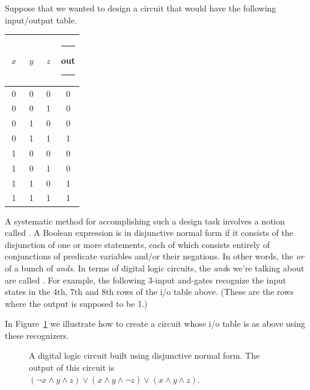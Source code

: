 Suppose that we wanted to design a circuit that would
have the following input/output table.

\begin{center}
\begin{tabular}{c|c|c|c}
$\; x \;$ & $\; y \;$ & $\; z \;$ & \rule{5pt}{0pt} out \rule{5pt}{0pt} \\ \hline
0 & 0 & 0 & 0 \\
0 & 0 & 1 & 0 \\
0 & 1 & 0 & 0 \\
0 & 1 & 1 & 1 \\ \hline
1 & 0 & 0 & 0 \\ 
1 & 0 & 1 & 0 \\ 
1 & 1 & 0 & 1 \\ 
1 & 1 & 1 & 1 \\
\end{tabular}
\end{center}

A systematic method for accomplishing such a design task involves
a notion called .  
A Boolean expression
is in disjunctive normal form if it consists of the disjunction of 
one or more statements, each of which consists entirely of conjunctions
of predicate variables and/or their negations.  In other words, the {\em or}
of a bunch of {\em ands}.  In terms of digital logic circuits, the {\em and}s 
we're talking about are called .  
For example,
the following 3-input and-gates recognize the input states in
the 4th, 7th and 8th rows of the i/o table above. (These are the rows 
where the output is supposed to be 1.)

\begin{center}

\end{center}

In Figure~\ref{fig:dnf} we illustrate how to create a circuit whose
i/o table is as above using these recognizers.

\begin{figure}[!hbtp] 
\begin{center}

\end{center}
\caption[Disjunctive normal form.]{A digital logic circuit built %
using disjunctive normal form.  The output of this circuit is %
$({\lnot}x \land y \land z) \lor (x \land y \land {\lnot}z) \lor (x \land y \land z)$.}
\label{fig:dnf}
\end{figure}

